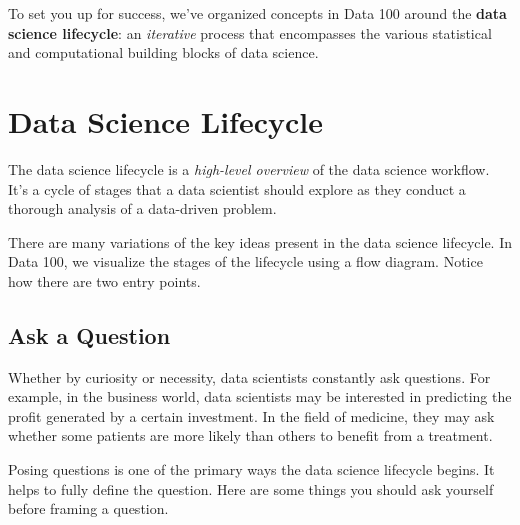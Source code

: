 \documentclass[
  letterpaper,
  DIV=11,
  numbers=noendperiod]{scrreprt}
\begin{document}
To set you up for success, we've organized concepts in Data 100 around
the \textbf{data science lifecycle}: an \emph{iterative} process that
encompasses the various statistical and computational building blocks of
data science.

\hypertarget{data-science-lifecycle}{%
\section{Data Science Lifecycle}\label{data-science-lifecycle}}

The data science lifecycle is a \emph{high-level overview} of the data
science workflow. It's a cycle of stages that a data scientist should
explore as they conduct a thorough analysis of a data-driven problem.

There are many variations of the key ideas present in the data science
lifecycle. In Data 100, we visualize the stages of the lifecycle using a
flow diagram. Notice how there are two entry points.

\hypertarget{ask-a-question}{%
\subsection{Ask a Question}\label{ask-a-question}}

Whether by curiosity or necessity, data scientists constantly ask
questions. For example, in the business world, data scientists may be
interested in predicting the profit generated by a certain investment.
In the field of medicine, they may ask whether some patients are more
likely than others to benefit from a treatment.

Posing questions is one of the primary ways the data science lifecycle
begins. It helps to fully define the question. Here are some things you
should ask yourself before framing a question.
\end{document}
